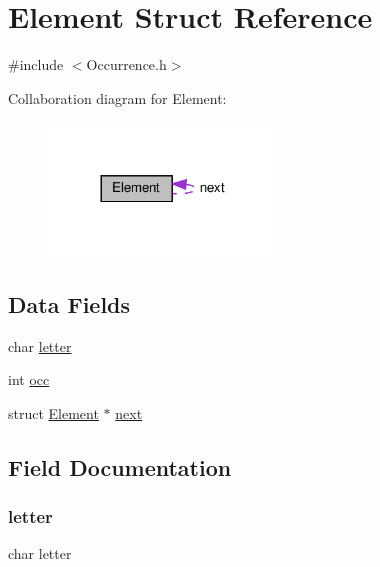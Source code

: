 \hypertarget{struct_element}{}\section{Element Struct Reference}
\label{struct_element}


{\ttfamily \#include $<$Occurrence.\+h$>$}



Collaboration diagram for Element\+:\nopagebreak
\begin{figure}[H]
\begin{center}
\leavevmode
\includegraphics[width=173pt]{struct_element__coll__graph}
\end{center}
\end{figure}
\subsection*{Data Fields}
\begin{DoxyCompactItemize}
\item 
char \hyperlink{struct_element_ac632f0e58c93e01b2bfbb3015c8de34f}{letter}
\item 
int \hyperlink{struct_element_af31c4cdd2ddb799512125a78038c283f}{occ}
\item 
struct \hyperlink{struct_element}{Element} $\ast$ \hyperlink{struct_element_a865f404995b432c38f0626e557399d27}{next}
\end{DoxyCompactItemize}


\subsection{Field Documentation}
\mbox{\label{struct_element_ac632f0e58c93e01b2bfbb3015c8de34f}} 
\subsubsection{\texorpdfstring{letter}{letter}}
{\footnotesize\ttfamily char letter}

